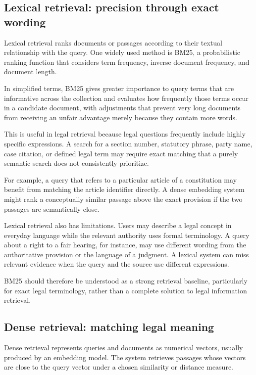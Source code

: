 \subsection{Lexical retrieval: precision through exact wording}

Lexical retrieval ranks documents or passages according to their textual relationship with the query.
One widely used method is BM25, a probabilistic ranking function that considers term frequency,
inverse document frequency, and document length.

In simplified terms, BM25 gives greater importance to query terms that are informative across the
collection and evaluates how frequently those terms occur in a candidate document, with adjustments
that prevent very long documents from receiving an unfair advantage merely because they contain more
words.

This is useful in legal retrieval because legal questions frequently include highly specific
expressions. A search for a section number, statutory phrase, party name, case citation, or defined
legal term may require exact matching that a purely semantic search does not consistently prioritize.

For example, a query that refers to a particular article of a constitution may benefit from matching
the article identifier directly. A dense embedding system might rank a conceptually similar passage
above the exact provision if the two passages are semantically close.

Lexical retrieval also has limitations. Users may describe a legal concept in everyday language while
the relevant authority uses formal terminology. A query about a right to a fair hearing, for instance,
may use different wording from the authoritative provision or the language of a judgment. A lexical
system can miss relevant evidence when the query and the source use different expressions.

BM25 should therefore be understood as a strong retrieval baseline, particularly for exact legal
terminology, rather than a complete solution to legal information retrieval.

\subsection{Dense retrieval: matching legal meaning}

Dense retrieval represents queries and documents as numerical vectors, usually produced by an
embedding model. The system retrieves passages whose vectors are close to the query vector under a
chosen similarity or distance measure.

